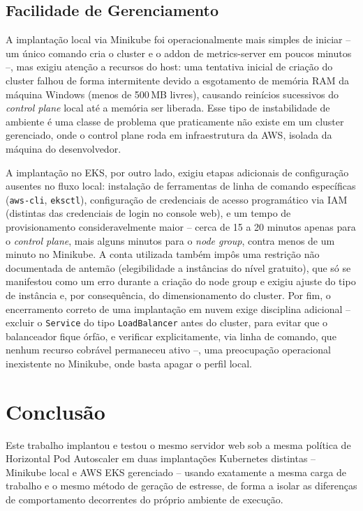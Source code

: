 \documentclass[12pt]{article}
\begin{document}
\subsection{Facilidade de Gerenciamento}

A implantação local via Minikube foi operacionalmente mais simples de
iniciar -- um único comando cria o cluster e o addon de metrics-server em
poucos minutos --, mas exigiu atenção a recursos do host: uma tentativa
inicial de criação do cluster falhou de forma intermitente devido a
esgotamento de memória RAM da máquina Windows (menos de 500\,MB livres),
causando reinícios sucessivos do \emph{control plane} local até a memória
ser liberada. Esse tipo de instabilidade de ambiente é uma classe de
problema que praticamente não existe em um cluster gerenciado, onde o
control plane roda em infraestrutura da AWS, isolada da máquina do
desenvolvedor.

A implantação no EKS, por outro lado, exigiu etapas adicionais de
configuração ausentes no fluxo local: instalação de ferramentas de linha de
comando específicas (\texttt{aws-cli}, \texttt{eksctl}), configuração de
credenciais de acesso programático via IAM (distintas das credenciais de
login no console web), e um tempo de provisionamento consideravelmente
maior -- cerca de 15 a 20 minutos apenas para o \emph{control plane}, mais
alguns minutos para o \emph{node group}, contra menos de um minuto no
Minikube. A conta utilizada também impôs uma restrição não documentada de
antemão (elegibilidade a instâncias do nível gratuito), que só se
manifestou como um erro durante a criação do node group e exigiu ajuste do
tipo de instância e, por consequência, do dimensionamento do cluster. Por
fim, o encerramento correto de uma implantação em nuvem exige disciplina
adicional -- excluir o \texttt{Service} do tipo \texttt{LoadBalancer} antes
do cluster, para evitar que o balanceador fique órfão, e verificar
explicitamente, via linha de comando, que nenhum recurso cobrável
permaneceu ativo --, uma preocupação operacional inexistente no Minikube,
onde basta apagar o perfil local.

\section{Conclusão}

Este trabalho implantou e testou o mesmo servidor web sob a mesma política
de Horizontal Pod Autoscaler em duas implantações Kubernetes distintas --
Minikube local e AWS EKS gerenciado -- usando exatamente a mesma carga de
trabalho e o mesmo método de geração de estresse, de forma a isolar as
diferenças de comportamento decorrentes do próprio ambiente de execução.
\end{document}
